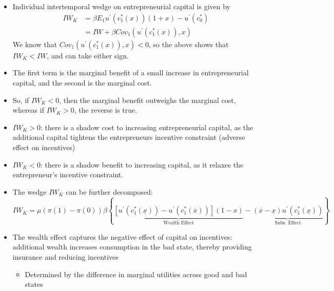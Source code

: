 \documentclass[11pt]{article}
\begin{document}
\section{\cite{albanesi2006optimal}}
\begin{itemize}
    \item Individual intertemporal wedge on entrepreneurial capital is given by 
    \begin{align*}
        IW_{K}&=\beta E_{1}u^{\prime}\left(c_{1}^{*}\left(x\right)\right)\left(1+x\right)-u^{\prime}\left(c_{0}^{*}\right)\\&=IW+\beta Cov_{1}\left(u^{\prime}\left(c_{1}^{*}\left(x\right)\right),x\right)
    \end{align*}
    We know that \( Cov_{1}\left(u^{\prime}\left(c_{1}^{*}\left(x\right)\right),x\right)<0 \), so the above shows that \( IW_{K}<IW \), and can take either sign. 
    \item The first term is the marginal benefit of a small increase in entrepreneurial capital, and the second is the marginal cost. 
    \item So, if \( IW_{K}<0 \), then the marginal benefit outweighs the marginal cost, whereas if \( IW_{K}>0 \), the reverse is true. 
    \item  \( IW_{K}>0 \): there is a shadow cost to increasing entrepreneurial capital, as the additional capital tightens the entrepreneurs incentive constraint (adverse effect on incentives)
    \item \( IW_{K}<0 \): there is a shadow benefit to increasing capital, as it relaxes the entrepreneur's incentive constraint. 
    \item The wedge \( IW_K \) can be further decomposed: 
    \begin{equation*}
        IW_{K}=\mu\left(\pi\left(1\right)-\pi\left(0\right)\right)\beta\left\{ \underbrace{\left[u^{\prime}\left(c_{1}^{*}\left(\underline{x}\right)\right)-u^{\prime}\left(c_{1}^{*}\left(\overline{x}\right)\right)\right]\left(1-x\right)}_{\text{Wealth Effect}}-\underbrace{\left(\overline{x}-\underline{x}\right)u^{\prime}\left(c_{1}^{*}\left(\underline{x}\right)\right)}_{\text{Subs. Effect}}\right\} 
    \end{equation*} 
    \item The wealth effect captures the negative effect of capital on incentives: additional wealth increases consumption in the bad state, thereby providing insurance and reducing incentives
    \begin{itemize}
        \item Determined by the difference in marginal utilities across good and bad states

\end{itemize}
\end{itemize}
\end{document}
